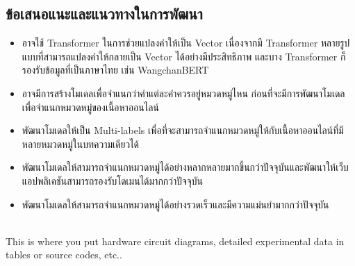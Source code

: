 \documentclass[12pt,oneside,openright,a4paper]{cpe-thai-project}
\begin{document}
  \subsection{ข้อเสนอแนะและแนวทางในการพัฒนา}
    \begin{itemize}
      \item อาจใช้ Transformer ในการช่วยแปลงคำให้เป็น Vector เนื่องจากมี Transformer หลายรูปแบบที่สามารถแปลงคำให้กลายเป็น Vector ได้อย่างมีประสิทธิภาพ
            และบาง Transformer ก็รองรับข้อมูลที่เป็นภาษาไทย เช่น WangchanBERT
      \item อาจมีการสร้างโมเดลเพื่อจำแนกว่าคำแต่ละคำควรอยู่หมวดหมู่ไหน ก่อนที่จะมีการพัฒนาโมเดลเพื่อจำแนกหมวดหมู่ของเนื้อหาออนไลน์
      \item พัฒนาโมเดลให้เป็น Multi-labels เพื่อที่จะสามารถจำแนกหมวดหมู่ให้กับเนื้อหาออนไลน์ที่มีหลายหมวดหมู่ในบทความเดียวได้
      \item พัฒนาโมเดลให้สามารถจำแนกหมวดหมู่ได้อย่างหลากหลายมากขึ้นกว่าปัจจุบันและพัฒนาให้เว็บแอปพลิเคชันสามารถรองรับโดเมนได้มากกว่าปัจจุบัน
      \item พัฒนาโมเดลให้สามารถจำแนกหมวดหมู่ได้อย่างรวดเร็วและมีความแม่นยำมากกว่าปัจจุบัน
    \end{itemize}




\makeatletter
\g@addto@macro{\UrlBreaks}{\UrlOrds}
\makeatother




 \\

This is where you put hardware circuit diagrams, detailed experimental data in tables or source codes, etc.. \\ \bigskip
\end{document}
